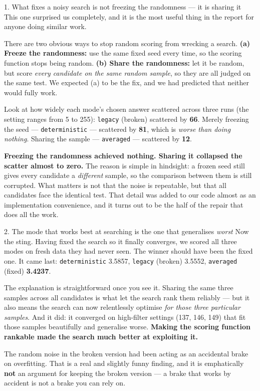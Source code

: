 \documentclass[11pt]{article}
\begin{document}
\begin{keybox}{1. What fixes a noisy search is not freezing the randomness --- it is sharing it}
This one surprised us completely, and it is the most useful thing in the report for anyone doing similar
work.

There are two obvious ways to stop random scoring from wrecking a search. \textbf{(a) Freeze the
randomness:} use the same fixed seed every time, so the scoring function stops being random.
\textbf{(b) Share the randomness:} let it be random, but score \emph{every candidate on the same random
sample}, so they are all judged on the same test. We expected (a) to be the fix, and we had predicted
that neither would fully work.

Look at how widely each mode's chosen answer scattered across three runs (the setting ranges from 5 to
255): \texttt{legacy} (broken) scattered by \textbf{66}. Merely freezing the seed --- \texttt{deterministic}
--- scattered by \textbf{81}, which is \emph{worse than doing nothing}. Sharing the sample ---
\texttt{averaged} --- scattered by \textbf{12}.

\textbf{Freezing the randomness achieved nothing. Sharing it collapsed the scatter almost to zero.} The
reason is simple in hindsight: a frozen seed still gives every candidate a \emph{different} sample, so
the comparison between them is still corrupted. What matters is not that the noise is repeatable, but
that all candidates face the identical test. That detail was added to our code almost as an
implementation convenience, and it turns out to be the half of the repair that does all the work.
\end{keybox}

\begin{keybox}{2. The mode that works best at searching is the one that generalises \emph{worst}}
Now the sting. Having fixed the search so it finally converges, we scored all three modes on fresh data
they had never seen. The winner should have been the fixed one. It came last:
\texttt{deterministic} 3.5857, \texttt{legacy} (broken) 3.5552, \texttt{averaged} (fixed)
\textbf{3.4237}.

The explanation is straightforward once you see it. Sharing the same three samples across all candidates
is what let the search rank them reliably --- but it also means the search can now relentlessly optimise
\emph{for those three particular samples}. And it did: it converged on high-filter settings (137, 146,
149) that fit those samples beautifully and generalise worse. \textbf{Making the scoring function
rankable made the search much better at exploiting it.}

The random noise in the broken version had been acting as an accidental brake on overfitting. That is a
real and slightly funny finding, and it is emphatically \textbf{not} an argument for keeping the broken
version --- a brake that works by accident is not a brake you can rely on.
\end{keybox}
\end{document}
